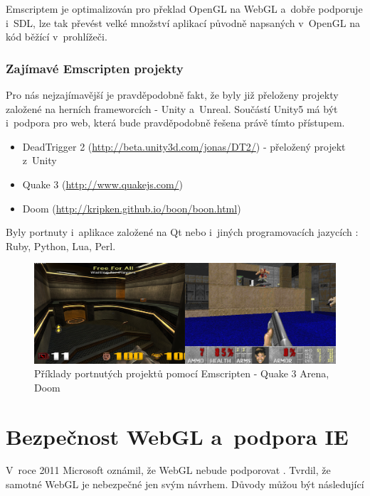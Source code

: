 \documentclass[12pt,a4paper,titlepage,final]{report}
\begin{document}
Emscriptem je optimalizován pro překlad OpenGL na WebGL a~dobře podporuje i~SDL, lze tak převést velké množství aplikací původně napsaných v~OpenGL na kód běžící v~prohlížeči.

\subsubsection{Zajímavé Emscripten projekty}

Pro nás nejzajímavější je pravděpodobně fakt, že byly již přeloženy projekty založené na herních frameworcích - Unity \cite{unity} a~Unreal. Součástí Unity5 má být i~podpora pro web, která bude pravděpodobně řešena právě tímto přístupem.

\begin{itemize}
	\item DeadTrigger 2 (\url{http://beta.unity3d.com/jonas/DT2/}) - přeložený projekt z~Unity
	\item Quake 3 (\url{http://www.quakejs.com/})
	\item Doom (\url{http://kripken.github.io/boon/boon.html})
\end{itemize}

Byly portnuty i~aplikace založené na Qt nebo i~jiných programovacích jazycích \cite{portex}: Ruby, Python, Lua, Perl.

\begin{figure}[ht]
\begin{center}
\includegraphics[width=14cm]{images/quakedoom.jpg}
\caption{Příklady portnutých projektů pomocí Emscripten - Quake 3 Arena, Doom}
\label{fig:theory}
\end{center}
\end{figure}

\section{Bezpečnost WebGL a~podpora IE}

V~roce 2011 Microsoft oznámil, že WebGL nebude podporovat \cite{arstechnica}. Tvrdil, že samotné WebGL je nebezpečné jen svým návrhem. Důvody můžou být následující
\end{document}
